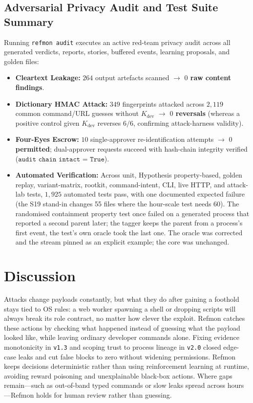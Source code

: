 \documentclass[10pt,twocolumn,letterpaper]{article}
\makeatletter
\theoremstyle{plain}
\theoremstyle{definition}
\theoremstyle{remark}
\DeclareRobustCommand{\_}{\ifmmode\nfss@text{\textunderscore}\else\textunderscore\penalty\@highpenalty\hskip\z@skip\fi}
\makeatother
\begin{document}
\subsection{Adversarial Privacy Audit and Test Suite Summary}
\label{sec:privacy_eval}

Running \texttt{refmon audit} executes an active red-team privacy audit across all generated verdicts, reports, stories, buffered events, learning proposals, and golden files:
\begin{itemize}[leftmargin=1.3em,itemsep=1pt,topsep=2pt]
  \item \textbf{Cleartext Leakage:} $264$ output artefacts scanned $\to$ \textbf{$0$ raw content findings}.
  \item \textbf{Dictionary HMAC Attack:} $349$ fingerprints attacked across $2,119$ common command/URL guesses without $K_{\text{dev}}$ $\to$ \textbf{$0$ reversals} (whereas a positive control given $K_{\text{dev}}$ reverses $6/6$, confirming attack-harness validity).
  \item \textbf{Four-Eyes Escrow:} $10$ single-approver re-identification attempts $\to$ \textbf{$0$ permitted}; dual-approver requests succeed with hash-chain integrity verified ($\texttt{audit chain intact = True}$).
  \item \textbf{Automated Verification:} Across unit, Hypothesis property-based, golden replay, variant-matrix, rootkit, command-intent, CLI, live HTTP, and attack-lab tests, $1,925$ automated tests pass, with one documented expected failure (the S19 stand-in changes 55 files where the hour-scale test needs 60). The randomised containment property test once failed on a generated process that reported a second parent later; the tagger keeps the parent from a process's first event, the test's own oracle took the last one. The oracle was corrected and the stream pinned as an explicit example; the core was unchanged.
\end{itemize}

\clearpage
\section{Discussion}
\label{sec:discussion}
Attacks change payloads constantly, but what they do after gaining a foothold stays tied to OS rules: a web worker spawning a shell or dropping scripts will always break its role contract, no matter how clever the exploit. Refmon catches these actions by checking what happened instead of guessing what the payload looked like, while leaving ordinary developer commands alone. Fixing evidence monotonicity in \texttt{v1.3} and scoping trust to process lineage in \texttt{v2.0} closed edge-case leaks and cut false blocks to zero without widening permissions. Refmon keeps decisions deterministic rather than using reinforcement learning at runtime, avoiding reward poisoning and unexplainable black-box actions. Where gaps remain---such as out-of-band typed commands or slow leaks spread across hours---Refmon holds for human review rather than guessing.
\end{document}

